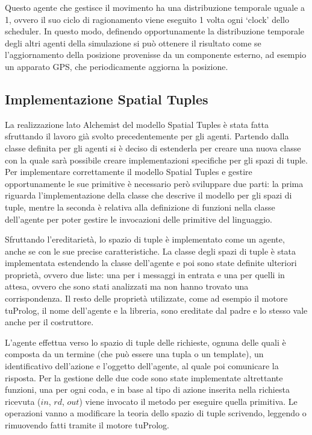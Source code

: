 Questo agente che gestisce il movimento ha una distribuzione temporale uguale a 1, ovvero il suo ciclo di ragionamento viene eseguito 1 volta ogni `clock' dello scheduler. In questo modo, definendo opportunamente la distribuzione temporale degli altri agenti della simulazione si può ottenere il risultato come se l'aggiornamento della posizione provenisse da un componente esterno, ad esempio un apparato GPS, che periodicamente aggiorna la posizione.

\subsection{Implementazione Spatial Tuples}\label{sctn:ImplementazioneSpatialTuples}
La realizzazione lato Alchemist del modello Spatial Tuples è stata fatta sfruttando il lavoro già svolto precedentemente per gli agenti. Partendo dalla classe definita per gli agenti si è deciso di estenderla per creare una nuova classe con la quale sarà possibile creare implementazioni specifiche per gli spazi di tuple. Per implementare correttamente il modello Spatial Tuples e gestire opportunamente le sue primitive è necessario però sviluppare due parti: la prima riguarda l'implementazione della classe che descrive il modello per gli spazi di tuple, mentre la seconda è relativa alla definizione di funzioni nella classe dell'agente per poter gestire le invocazioni delle primitive del linguaggio.

Sfruttando l'ereditarietà, lo spazio di tuple è implementato come un agente, anche se con le sue precise caratteristiche. La classe degli spazi di tuple è stata implementata estendendo la classe dell'agente e poi sono state definite ulteriori proprietà, ovvero due liste: una per i messaggi in entrata e una per quelli in attesa, ovvero che sono stati analizzati ma non hanno trovato una corrispondenza.
Il resto delle proprietà utilizzate, come ad esempio il motore tuProlog, il nome dell'agente e la libreria, sono ereditate dal padre e lo stesso vale anche per il costruttore.

L'agente effettua verso lo spazio di tuple delle richieste, ognuna delle quali è composta da un termine (che può essere una tupla o un template), un identificativo dell'azione e l'oggetto dell'agente, al quale poi comunicare la risposta.
Per la gestione delle due code sono state implementate altrettante funzioni, una per ogni coda, e in base al tipo di azione inserita nella richiesta ricevuta ($in$, $rd$, $out$) viene invocato il metodo per eseguire quella primitiva. Le operazioni vanno a modificare la teoria dello spazio di tuple scrivendo, leggendo o rimuovendo fatti tramite il motore tuProlog.

